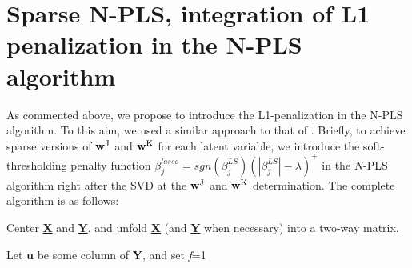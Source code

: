 \section{Sparse N-PLS, integration of L1 penalization in the N-PLS algorithm}
\label{NPLSpenalization}
As commented above, we propose to introduce the L1-penalization in the N-PLS algorithm. To this aim, we used a similar approach to that of \cite{le2008sparse}. Briefly, to achieve sparse versions of $\textbf{\text{w}}^\text{J}$ and $\textbf{\text{w}}^\text{K}$ for each latent variable, we introduce the soft-thresholding penalty function $\beta_j^{lasso}=sgn(\beta_j^{LS})(|\beta_j^{LS}|-\lambda)^+$  in the $N$-PLS algorithm right after the SVD at the $\textbf{\text{w}}^\text{J}$ and $\textbf{\text{w}}^\text{K}$ determination. The complete algorithm is as follows:


\vspace{20pt}
Center \textbf{\underline{X}} and \textbf{\underline{Y}}, and unfold \textbf{\underline{X}} (and \textbf{\underline{Y}} when necessary) into a two-way matrix.

Let \textbf{u} be some column of \textbf{Y}, and set \textit{f}=1

